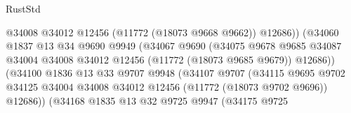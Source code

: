 \begin{lexlean}{RustStd}
\begin{coremodule}
                                            @34008
                                            @34012
                                            @12456
                                            (@11772 (@18073 @9668 @9662))
                                            @12686))
                                        (@34060
                                          @1837
                                          @13
                                          @34
                                          @9690
                                          @9949
                                          (@34067
                                            @9690
                                            (@34075
                                              @9678
                                              @9685
                                              @34087
                                              @34004
                                              @34008
                                              @34012
                                              @12456
                                              (@11772 (@18073 @9685 @9679))
                                              @12686))
                                          (@34100
                                            @1836
                                            @13
                                            @33
                                            @9707
                                            @9948
                                            (@34107
                                              @9707
                                              (@34115
                                                @9695
                                                @9702
                                                @34125
                                                @34004
                                                @34008
                                                @34012
                                                @12456
                                                (@11772 (@18073 @9702 @9696))
                                                @12686))
                                            (@34168
                                              @1835
                                              @13
                                              @32
                                              @9725
                                              @9947
                                              (@34175
                                                @9725

\end{coremodule}
\end{lexlean}
